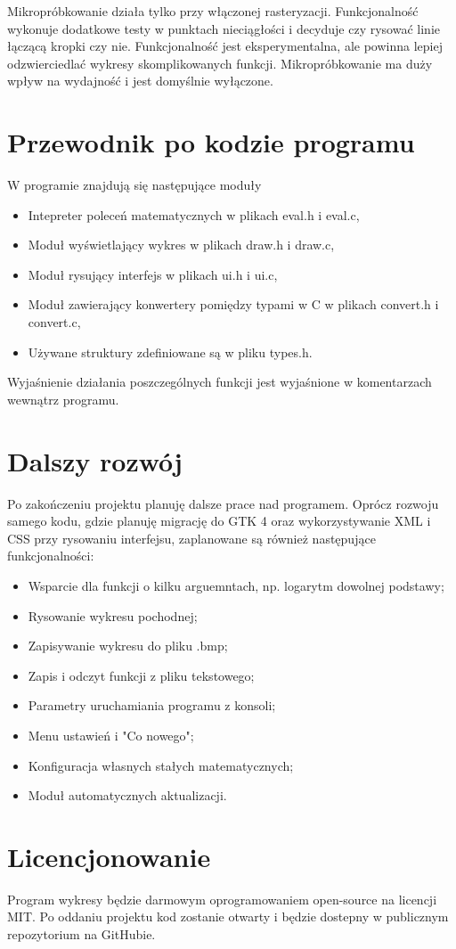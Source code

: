 \documentclass[a4paper]{article}
\begin{document}
Mikropróbkowanie działa tylko przy włączonej rasteryzacji. Funkcjonalność wykonuje dodatkowe testy w punktach nieciągłości i decyduje czy rysować linie łączącą kropki czy nie. Funkcjonalność jest eksperymentalna, ale powinna lepiej odzwierciedlać wykresy skomplikowanych funkcji.
Mikropróbkowanie ma duży wpływ na wydajność i jest domyślnie wyłączone.

\section{Przewodnik po kodzie programu}

W programie znajdują się następujące moduły
\begin{itemize}
    \item Intepreter poleceń matematycznych w plikach eval.h i eval.c,
    \item Moduł wyświetlający wykres w plikach draw.h i draw.c,
    \item Moduł rysujący interfejs w plikach ui.h i ui.c,
    \item Moduł zawierający konwertery pomiędzy typami w C w plikach convert.h i convert.c,
    \item Używane struktury zdefiniowane są w pliku types.h.
\end{itemize}

Wyjaśnienie działania poszczególnych funkcji jest wyjaśnione w komentarzach wewnątrz programu.

\section{Dalszy rozwój}

Po zakończeniu projektu planuję dalsze prace nad programem. Oprócz rozwoju samego kodu, gdzie planuję migrację do GTK 4 oraz wykorzystywanie XML i CSS przy rysowaniu interfejsu, zaplanowane są również następujące funkcjonalności:

\begin{itemize}
    \item Wsparcie dla funkcji o kilku arguemntach, np. logarytm dowolnej podstawy;
    \item Rysowanie wykresu pochodnej;
    \item Zapisywanie wykresu do pliku .bmp;
    \item Zapis i odczyt funkcji z pliku tekstowego;
    \item Parametry uruchamiania programu z konsoli;
    \item Menu ustawień i "Co nowego";
    \item Konfiguracja własnych stałych matematycznych;
    \item Moduł automatycznych aktualizacji.
\end{itemize}

\section{Licencjonowanie}

Program wykresy będzie darmowym oprogramowaniem open-source na licencji MIT. Po oddaniu projektu kod zostanie otwarty i będzie dostepny w publicznym repozytorium na GitHubie.
\end{document}

